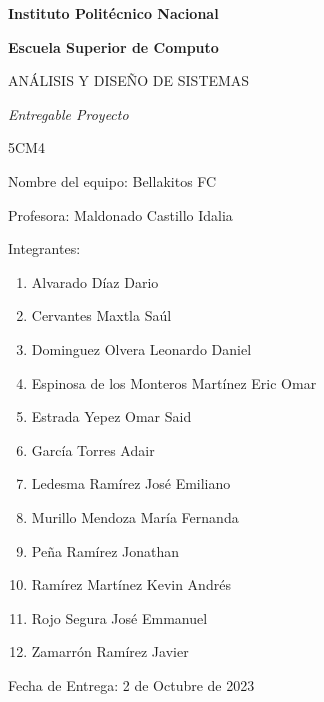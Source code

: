 \documentclass{article}
\begin{document}
\begin{titlepage}
\centering
{\bfseries\LARGE Instituto Politécnico Nacional \par}
\vspace{.5cm}
{\bfseries\LARGE Escuela Superior de Computo \par}
\vspace{1cm}
\Large ANÁLISIS Y DISEÑO DE SISTEMAS \par
\vspace{1cm}
\itshape\LARGE Entregable Proyecto \par
\vspace{1cm}
\LARGE 5CM4\par
\vspace{1cm}

\begin{FlushLeft}
\Large Nombre del equipo: Bellakitos FC\par
\vspace{0.5cm}
\Large Profesora: Maldonado Castillo Idalia	 \par
\vspace{0.5cm}
    Integrantes:\\
    \begin{enumerate}
    \item Alvarado Díaz Dario\\
   \item Cervantes Maxtla Saúl\\
    \item Dominguez Olvera Leonardo Daniel\\
    \item Espinosa de los Monteros Martínez Eric Omar\\
   \item Estrada Yepez Omar Said\\
   \item García Torres Adair\\
   \item Ledesma Ramírez José Emiliano\\
   \item Murillo Mendoza María Fernanda\\
   \item Peña Ramírez Jonathan\\
   \item Ramírez Martínez Kevin Andrés\\
   \item Rojo Segura José Emmanuel\\
   \item Zamarrón Ramírez Javier\\
    \end{enumerate}
\vspace{.5cm}
\Large Fecha de Entrega: 2 de Octubre de 2023 \par
\vspace{.5cm}
\end{FlushLeft}
\end{titlepage}
\tableofcontents
\newpage
\end{document}
